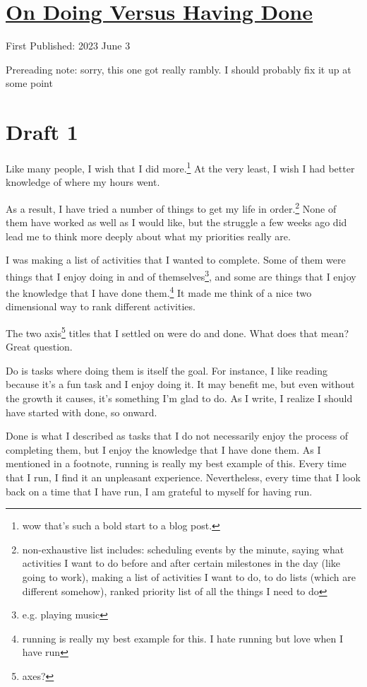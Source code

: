 \documentclass[12pt]{article}[titlepage]
\newcommand{\1}{\={a}}
\newcommand{\2}{\={e}}
\newcommand{\3}{\={\i}}
\newcommand{\4}{\=o}
\newcommand{\5}{\=u}
\newcommand{\6}{\={A}}
\renewcommand{\,}{\textsuperscript{,}}
\begin{document}
\doublespacing
\section{\href{do-versus-done.html}{On Doing Versus Having Done}}
First Published: 2023 June 3

Prereading note: sorry, this one got really rambly. I should probably fix it up at some point
\section{Draft 1}
Like many people, I wish that I did more.\footnote{wow that's such a bold start to a blog post.}
At the very least, I wish I had better knowledge of where my hours went.

As a result, I have tried a number of things to get my life in order.\footnote{non-exhaustive list includes: scheduling events by the minute, saying what activities I want to do before and after certain milestones in the day (like going to work), making a list of activities I want to do, to do lists (which are different somehow), ranked priority list of all the things I need to do}
None of them have worked as well as I would like, but the struggle a few weeks ago did lead me to think more deeply about what my priorities really are.

I was making a list of activities that I wanted to complete.
Some of them were things that I enjoy doing in and of themselves\footnote{e.g. playing music}, and some are things that I enjoy the knowledge that I have done them.\footnote{running is really my best example for this. I hate running but love when I have run}
It made me think of a nice two dimensional way to rank different activities.

The two axis\footnote{axes?} titles that I settled on were do and done.
What does that mean?
Great question.

Do is tasks where doing them is itself the goal.
For instance, I like reading because it's a fun task and I enjoy doing it.
It may benefit me, but even without the growth it causes, it's something I'm glad to do.
As I write, I realize I should have started with done, so onward.

Done is what I described as tasks that I do not necessarily enjoy the process of completing them, but I enjoy the knowledge that I have done them.
As I mentioned in a footnote, running is really my best example of this.
Every time that I run, I find it an unpleasant experience.
Nevertheless, every time that I look back on a time that I have run, I am grateful to myself for having run.
\end{document}
